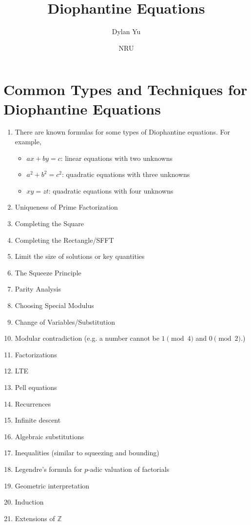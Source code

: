 \documentclass{article}
\title{Diophantine Equations}
\author{Dylan Yu}
\date{NRU}
\begin{document}
\maketitle

\section{Common Types and Techniques for Diophantine Equations}
\begin{enumerate}
    \item There are known formulas for some types of Diophantine equations. For example,
    \begin{itemize}
        \item $ax+by=c$: linear equations with two unknowns
        \item $a^2+b^2=c^2$: quadratic equations with three unknowns
        \item $xy=zt$: quadratic equations with four unknowns
    \end{itemize}
    \item Uniqueness of Prime Factorization
    \item Completing the Square
    \item Completing the Rectangle/SFFT
    \item Limit the size of solutions or key quantities
    \item The Squeeze Principle
    \item Parity Analysis
    \item Choosing Special Modulus
    \item Change of Variables/Substitution
    \item Modular contradiction (e.g. a number cannot be $1\pmod{4}$ and $0\pmod{2}$.)
    \item Factorizations
    \item LTE
    \item Pell equations
    \item Recurrences
    \item Infinite descent
    \item Algebraic substitutions
    \item Inequalities (similar to squeezing and bounding)
    \item Legendre's formula for $p$-adic valuation of factorials
    \item Geometric interpretation
    \item Induction
    \item Extensions of $\mathbb{Z}$
\end{enumerate}
\end{document}
